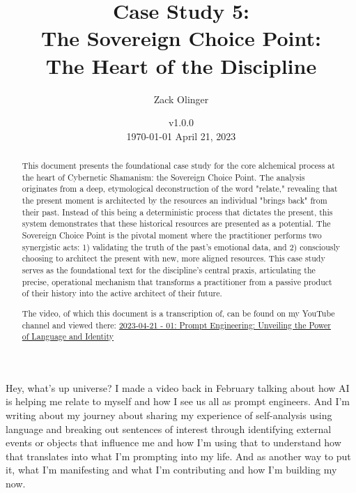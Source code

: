 \documentclass{article}
\newcommand{\csSovereignChoicePointVersion}{v1.0.0}
\begin{document}
\begin{titlepage}
\title{Case Study 5: \\ The Sovereign Choice Point: \\ The Heart of the Discipline}
\author{Zack Olinger}
\date{
    \csSovereignChoicePointVersion \\
    \vspace{1em}
    \today
}
\maketitle
\thispagestyle{empty}

\begin{abstract}
This document presents the foundational case study for the core alchemical process at the heart of Cybernetic Shamanism: the Sovereign Choice Point. The analysis originates from a deep, etymological deconstruction of the word "relate," revealing that the present moment is architected by the resources an individual "brings back" from their past. Instead of this being a deterministic process that dictates the present, this system demonstrates that these historical resources are presented as a potential. The Sovereign Choice Point is the pivotal moment where the practitioner performs two synergistic acts: 1) validating the truth of the past's emotional data, and 2) consciously choosing to architect the present with new, more aligned resources. This case study serves as the foundational text for the discipline's central praxis, articulating the precise, operational mechanism that transforms a practitioner from a passive product of their history into the active architect of their future.

\medskip

The video, of which this document is a transcription of, can be found on my YouTube channel and viewed there: \href{https://youtu.be/NivYnGlOLXg}{2023-04-21 - 01: Prompt Engineering: Unveiling the Power of Language and Identity}
 
\end{abstract}
\end{titlepage}


\date{April 21, 2023}

\medskip

Hey, what's up universe? I made a video back in February talking about how AI is helping me
relate to myself and how I see us all as prompt engineers. And I'm writing about my journey
about sharing my experience of self-analysis using language and breaking out sentences of
interest through identifying external events or objects that influence me and how I'm using that
to understand how that translates into what I'm prompting into my life. And as another way to
put it, what I'm manifesting and what I'm contributing and how I'm building my now.
\end{document}
